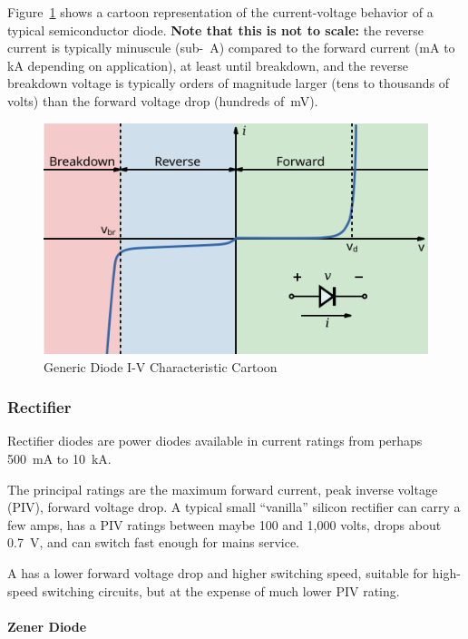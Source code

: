 \documentclass[11pt]{article}
\newlength\onenarrow
\begin{document}
Figure~\ref{fig:ivdiode} shows a cartoon representation of the
current-voltage behavior of a typical semiconductor diode. {\bf Note
  that this is not to scale: }the reverse current is typically
minuscule (sub-\unit{\mu A}) compared to the forward current
(\unit{mA} to \unit{kA} depending on application), at least until
breakdown, and the reverse breakdown voltage is typically orders of
magnitude larger (tens to thousands of volts) than the forward voltage
drop (hundreds of~\unit{mV}).

\begin{figure}
  \centering
  \includegraphics[width=\onenarrow]{ivdiode}
  \caption{Generic Diode I-V Characteristic Cartoon}
  \label{fig:ivdiode}
\end{figure}


\subsubsection{Rectifier}

Rectifier diodes are power diodes available in current ratings from
perhaps 500~\unit{mA} to 10~\unit{kA}.

The principal ratings are the maximum forward current, peak inverse
voltage (PIV), forward voltage drop. A typical small ``vanilla''
silicon rectifier can carry a few amps, has a PIV ratings between
maybe 100 and 1,000 volts, drops about 0.7~\unit{V}, and can switch
fast enough for mains service.

A  has a lower forward voltage drop and higher
switching speed, suitable for high-speed switching circuits, but at
the expense of much lower PIV rating.

\paragraph{Zener Diode}
\end{document}
